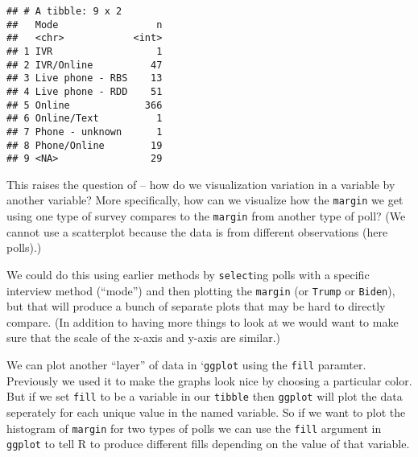 \documentclass[
]{article}
\begin{document}
\begin{verbatim}
## # A tibble: 9 x 2
##   Mode                 n
##   <chr>            <int>
## 1 IVR                  1
## 2 IVR/Online          47
## 3 Live phone - RBS    13
## 4 Live phone - RDD    51
## 5 Online             366
## 6 Online/Text          1
## 7 Phone - unknown      1
## 8 Phone/Online        19
## 9 <NA>                29
\end{verbatim}

This raises the question of -- how do we visualization variation in a
variable by another variable? More specifically, how can we visualize
how the \texttt{margin} we get using one type of survey compares to the
\texttt{margin} from another type of poll? (We cannot use a scatterplot
because the data is from different observations (here polls).)

We could do this using earlier methods by \texttt{select}ing polls with
a specific interview method (``mode'') and then plotting the
\texttt{margin} (or \texttt{Trump} or \texttt{Biden}), but that will
produce a bunch of separate plots that may be hard to directly compare.
(In addition to having more things to look at we would want to make sure
that the scale of the x-axis and y-axis are similar.)

We can plot another ``layer'' of data in `\texttt{ggplot} using the
\texttt{fill} paramter. Previously we used it to make the graphs look
nice by choosing a particular color. But if we set \texttt{fill} to be a
variable in our \texttt{tibble} then \texttt{ggplot} will plot the data
seperately for each unique value in the named variable. So if we want to
plot the histogram of \texttt{margin} for two types of polls we can use
the \texttt{fill} argument in \texttt{ggplot} to tell R to produce
different fills depending on the value of that variable.
\end{document}

